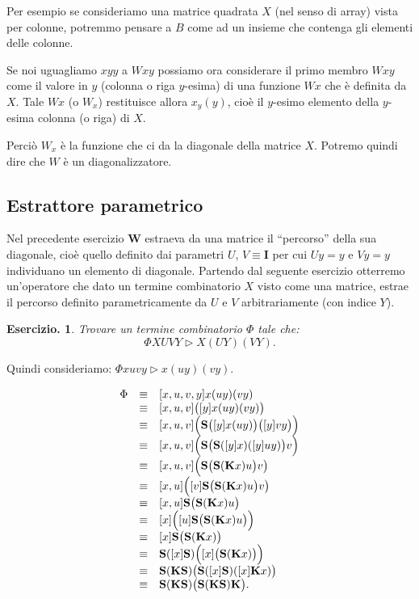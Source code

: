 \documentclass{book}
\newtheorem{ese}{Esercizio.}
\newcommand*{\ii}{\mathbf{I}}    %
\newcommand*{\kk}{\mathbf{K}}    %
\newcommand*{\sss}{\mathbf{S}}   %
\newcommand*{\ww}{\mathbf{W}}    %
\begin{document}
Per esempio se consideriamo una matrice quadrata $X$ (nel senso di array) vista
 per colonne, potremmo pensare a $B$ come ad un insieme che contenga gli 
elementi delle colonne.

Se noi uguagliamo $xyy$ a $Wxy$ possiamo ora considerare il primo membro $Wxy$
come il valore in $y$ (colonna o riga $y$-esima) di una funzione $Wx$ che \`e
definita da $X$. Tale $Wx$ (o $W_x$) restituisce allora $x_y(y)$, cio\`e il
$y$-esimo elemento della $y$-esima colonna (o riga) di $X$.

Perci\`o $W_x$ \`e la funzione che ci da la diagonale della matrice $X$. 
Potremo quindi dire che $W$ \`e un diagonalizzatore.

\subsection{Estrattore parametrico}
\label{Phi}
Nel precedente esercizio $\ww$ estraeva da una matrice il ``percorso'' della
sua diagonale, cio\`e quello definito dai parametri $U$, $V \equiv \ii$ per
cui $Uy = y$ e $Vy = y$ individuano un elemento di diagonale.
Partendo dal seguente esercizio otterremo un'operatore che dato un termine 
combinatorio $X$ visto come una matrice, estrae il percorso definito 
parametricamente da $U$ e $V$ arbitrariamente (con indice $Y$).

\begin{ese}
Trovare un termine combinatorio $\Phi$ tale che:
\[
\Phi XUVY \vartriangleright X(UY)(VY).
\]
\end{ese}
Quindi consideriamo: $\Phi xuvy \vartriangleright x(uy)(vy)$.

\[
\begin{array}{lcl}
\Phi & \equiv & [x,u,v,y]x(uy)(vy) \\
     & \equiv & [x,u,v]\bigl([y]x(uy)(vy)\bigr) \\
     & \equiv & [x,u,v]\Bigl(\sss \bigl([y]x(uy)\bigr)\bigl([y]vy\bigr)\Bigr)\\
     & \equiv & [x,u,v]\Bigl(\sss \bigl(\sss ([y]x)([y]uy)\bigr)v\Bigr) \\
     & \equiv & [x,u,v]\Bigl(\sss \bigl(\sss (\kk x)u\bigr)v\bigr) \\
     & \equiv & [x,u]\Bigl([v]\sss \bigl(\sss (\kk x)u\bigr)v\bigr) \\
     & \equiv & [x,u]\sss \bigl(\sss (\kk x)u\bigr) \\
     & \equiv & [x]\Bigl([u]\sss \bigl(\sss (\kk x)u\bigr)\Bigr) \\
     & \equiv & [x]\sss \bigl(\sss (\kk x)\bigr) \\ 
     & \equiv & \sss([x]\sss)\Bigl([x] \bigl(\sss (\kk x)\bigr) \Bigr)\\
     & \equiv & \sss(\kk\sss)\bigl(\sss([x]\sss)([x]\kk x)\bigr) \\
     & \equiv & \sss(\kk\sss)\bigl(\sss(\kk\sss)\kk\bigr).\\
\end{array}
\]
\end{document}
